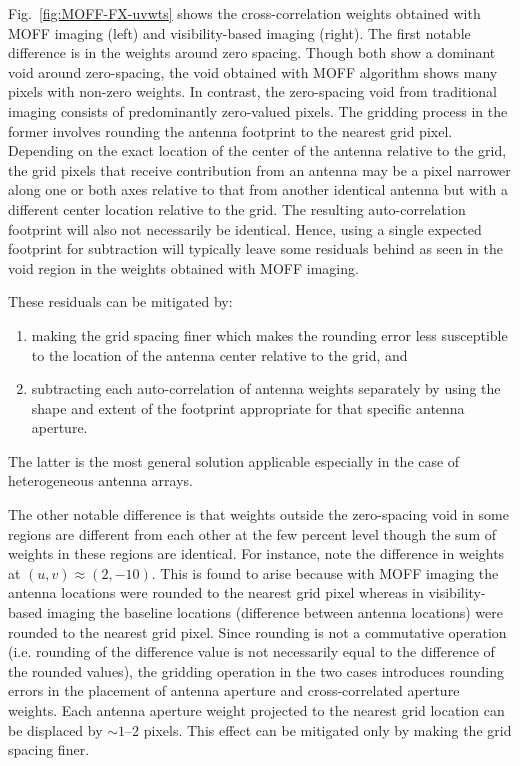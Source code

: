 \documentclass[a4paper,fleqn,usenatbib]{../mnras}
\begin{document}
Fig.~\ref{fig:MOFF-FX-uvwts} shows the cross-correlation weights obtained 
with MOFF imaging (left) and visibility-based imaging (right). The first 
notable difference is in the weights around zero spacing. Though both show a
dominant void around zero-spacing, the void obtained with MOFF algorithm shows 
many pixels with non-zero weights. In contrast, the zero-spacing void from 
traditional imaging consists of predominantly zero-valued pixels. The gridding
process in the former involves rounding the antenna footprint to the nearest 
grid pixel. Depending on the exact location of the center of the antenna 
relative to the grid, the grid pixels that receive contribution from an
antenna may be a pixel narrower along one or both axes relative to that from
another identical antenna but with a different center location relative to the
grid. The resulting auto-correlation footprint will also not necessarily be 
identical. Hence, using a single expected footprint for subtraction will
typically leave some residuals behind as seen in the void region in the 
weights obtained with MOFF imaging. 

These residuals can be mitigated by: 
\begin{enumerate}
  \item making the grid spacing finer which makes the rounding error less 
    susceptible to the location of the antenna center relative to the grid, 
    and
  \item subtracting each auto-correlation of antenna weights separately by 
    using the shape and extent of the footprint appropriate for that specific
    antenna aperture. 
\end{enumerate}
The latter is the most general solution applicable especially in the case of 
heterogeneous antenna arrays.

The other notable difference is that weights outside the zero-spacing void in
some regions are different from each other at the few percent level though the 
sum of weights in these regions are identical. For instance, note the 
difference in weights at $(u,v)\approx (2,-10)$. This is found to arise 
because with MOFF imaging the antenna locations were rounded to the nearest 
grid pixel whereas in visibility-based imaging the baseline locations 
(difference between antenna locations) were rounded to the nearest grid pixel. 
Since rounding is not a commutative operation (i.e. rounding of the difference 
value is not necessarily equal to the difference of the rounded values), the 
gridding operation in the two cases introduces rounding errors in the placement 
of antenna aperture and cross-correlated aperture weights. Each antenna 
aperture weight projected to the nearest grid location can be displaced by 
$\sim 1$--2 pixels. This effect can be mitigated only by making the grid 
spacing finer. 
\end{document}
